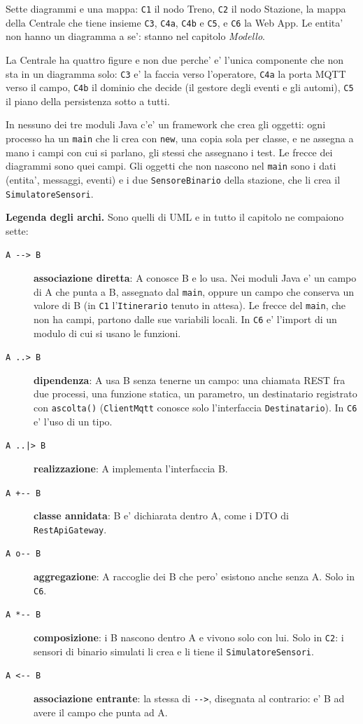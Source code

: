\documentclass[11pt]{article}
\begin{document}
Sette diagrammi e una mappa: \texttt{C1} il nodo Treno, \texttt{C2} il nodo Stazione, la mappa della Centrale che
tiene insieme \texttt{C3}, \texttt{C4a}, \texttt{C4b} e \texttt{C5}, e \texttt{C6} la Web App. Le entita' non hanno un diagramma a
se': stanno nel capitolo \emph{Modello}.

La Centrale ha quattro figure e non due perche' e' l'unica componente che non sta in un diagramma
solo: \texttt{C3} e' la faccia verso l'operatore, \texttt{C4a} la porta MQTT verso il campo, \texttt{C4b} il dominio che
decide (il gestore degli eventi e gli automi), \texttt{C5} il piano della persistenza sotto a tutti.

In nessuno dei tre moduli Java c'e' un framework che crea gli oggetti: ogni processo ha un \texttt{main}
che li crea con \texttt{new}, una copia sola per classe, e ne assegna a mano i campi con cui si parlano,
gli stessi che assegnano i test. Le frecce dei diagrammi sono quei campi. Gli oggetti che non nascono
nel \texttt{main} sono i dati (entita', messaggi, eventi) e i due \texttt{SensoreBinario} della stazione, che li crea
il \texttt{SimulatoreSensori}.

\textbf{Legenda degli archi.} Sono quelli di UML e in tutto il capitolo ne compaiono sette:

\begin{description}
\item[{\texttt{A -{}-{}> B}}] \textbf{associazione diretta}: A conosce B e lo usa. Nei moduli Java e' un campo di A che
punta a B, assegnato dal \texttt{main}, oppure un campo che conserva un valore di B (in \texttt{C1} l'\texttt{Itinerario}
tenuto in attesa). Le frecce del \texttt{main}, che non ha campi, partono dalle sue variabili locali. In
\texttt{C6} e' l'import di un modulo di cui si usano le funzioni.
\item[{\texttt{A ..> B}}] \textbf{dipendenza}: A usa B senza tenerne un campo: una chiamata REST fra due processi, una
funzione statica, un parametro, un destinatario registrato con \texttt{ascolta()} (\texttt{ClientMqtt} conosce
solo l'interfaccia \texttt{Destinatario}). In \texttt{C6} e' l'uso di un tipo.
\item[{\texttt{A ..|> B}}] \textbf{realizzazione}: A implementa l'interfaccia B.
\item[{\texttt{A +-{}-{} B}}] \textbf{classe annidata}: B e' dichiarata dentro A, come i DTO di \texttt{RestApiGateway}.
\item[{\texttt{A o-{}-{} B}}] \textbf{aggregazione}: A raccoglie dei B che pero' esistono anche senza A. Solo in \texttt{C6}.
\item[{\texttt{A *-{}-{} B}}] \textbf{composizione}: i B nascono dentro A e vivono solo con lui. Solo in \texttt{C2}: i
sensori di binario simulati li crea e li tiene il \texttt{SimulatoreSensori}.
\item[{\texttt{A <-{}-{} B}}] \textbf{associazione entrante}: la stessa di \texttt{-{}-{}>}, disegnata al contrario: e' B ad avere il
campo che punta ad A.
\end{description}
\end{document}
